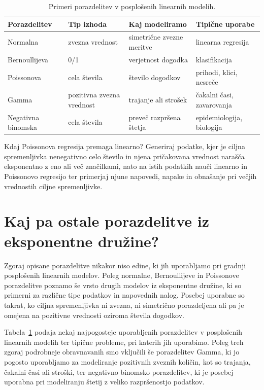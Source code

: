 \begin{table}[htb]
\centering
\small
\renewcommand{\arraystretch}{1.4}
\begin{tabularx}{\linewidth}{X X X X}
\toprule
Porazdelitev & Tip izhoda & Kaj modeliramo & Tipične uporabe \\
\midrule
Normalna & zvezna vrednost & simetrične zvezne meritve & linearna regresija \\
Bernoullijeva & 0/1 & verjetnost dogodka & klasifikacija \\
Poissonova & cela števila & število dogodkov & prihodi, klici, nesreče \\
Gamma & pozitivna zvezna vrednost & trajanje ali strošek & čakalni časi, zavarovanja \\
Negativna binomska & cela števila & preveč razpršena štetja & epidemiologija, biologija \\
\bottomrule
\end{tabularx}
\caption{Primeri porazdelitev v posplošenih linearnih modelih.}
\label{tab:glm}
\end{table}

\begin{exercise}{Kdaj Poissonova regresija premaga linearno?}
Generiraj podatke, kjer je ciljna spremenljivka nenegativno celo število in njena pričakovana vrednost narašča eksponentno z eno ali več značilkami, nato na istih podatkih nauči linearno in Poissonovo regresijo ter primerjaj njune napovedi, napake in obnašanje pri večjih vrednostih ciljne spremenljivke.
\end{exercise}

\section{Kaj pa ostale porazdelitve iz eksponentne družine?}

Zgoraj opisane porazdelitve nikakor niso edine, ki jih uporabljamo pri gradnji posplošenih linearnih modelov. Poleg normalne, Bernoullijeve in Poissonove porazdelitve poznamo še vrsto drugih modelov iz eksponentne družine, ki so primerni za različne tipe podatkov in napovednih nalog. Posebej uporabne so takrat, ko ciljna spremenljivka ni zvezna, ni simetrično porazdeljena ali pa je omejena na pozitivne vrednosti oziroma števila dogodkov.

Tabela~\ref{tab:glm} podaja nekaj najpogosteje uporabljenih porazdelitev v posplošenih linearnih modelih ter tipične probleme, pri katerih jih uporabimo. Poleg treh zgoraj podrobneje obravnavanih smo vključili še porazdelitev Gamma, ki jo pogosto uporabljamo za modeliranje pozitivnih zveznih količin, kot so trajanja, čakalni časi ali stroški, ter negativno binomsko porazdelitev, ki je posebej uporabna pri modeliranju štetij z veliko razpršenostjo podatkov.


